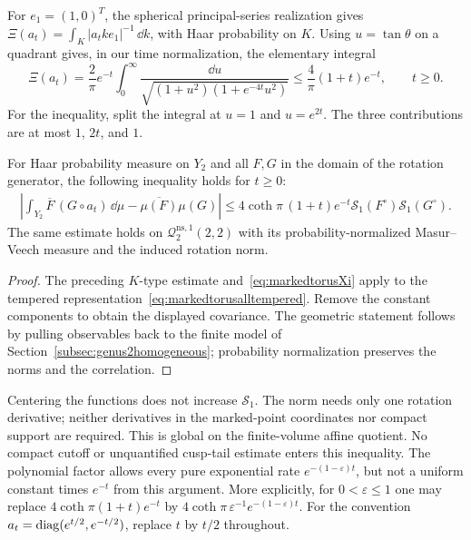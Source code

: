 For $e_1=(1,0)^T$, the spherical principal-series realization gives
$\Xi(a_t)=\int_K|a_tke_1|^{-1}\,\dd k$, with Haar probability on $K$.
Using $u=\tan\theta$ on a quadrant gives, in our time normalization,
the elementary integral
\begin{equation}
 \Xi(a_t)=\frac2\pi e^{-t}
   \int_0^\infty
    \frac{\dd u}{\sqrt{(1+u^2)(1+e^{-4t}u^2)}}
 \leq\frac4\pi(1+t)e^{-t},\qquad t\geq0.
 \label{eq:markedtorusXi}
\end{equation}
For the inequality, split the integral at $u=1$ and $u=e^{2t}$.
The three contributions are at most $1$, $2t$, and $1$.
\begin{theorem}
\label{thm:markedtorusmixing}
For Haar probability measure on $Y_2$ and all $F,G$ in the domain
of the rotation generator, the following inequality holds for $t\geq0$:
\begin{equation}
 \begin{split}
 \left|\int_{Y_2}\overline F\,(G\circ a_t)\,\dd\mu
       -\overline{\mu(F)}\mu(G)\right|
 \leq4\coth\pi\,(1+t)e^{-t}
       \mathcal S_1(F^\circ)\mathcal S_1(G^\circ).
 \end{split}
 \label{eq:markedtorusexplicitmix}
\end{equation}
The same estimate holds on $\mathcal Q^{\mathrm{ns},1}_2(2,2)$
with its probability-normalized Masur--Veech measure and the induced
rotation norm.
\end{theorem}
\begin{proof}
The preceding $K$-type estimate and~\eqref{eq:markedtorusXi} apply
to the tempered representation~\eqref{eq:markedtorusalltempered}.
Remove the constant components to obtain the displayed covariance.
The geometric statement follows by pulling observables back to the
finite model of Section~\ref{subsec:genus2homogeneous}; probability
normalization preserves the norms and the correlation.
\end{proof}
Centering the functions does not increase $\mathcal S_1$.
The norm needs only one rotation derivative; neither derivatives in
the marked-point coordinates nor compact support are required.
This is global on the finite-volume affine quotient. No compact
cutoff or unquantified cusp-tail estimate enters this inequality.
The polynomial factor allows every pure exponential rate
$e^{-(1-\varepsilon)t}$, but not a uniform constant times $e^{-t}$
from this argument. More explicitly, for $0<\varepsilon\leq1$ one
may replace $4\coth\pi(1+t)e^{-t}$ by
$4\coth\pi\,\varepsilon^{-1}e^{-(1-\varepsilon)t}$.
For the convention $a_t=\operatorname{diag}(e^{t/2},e^{-t/2})$, replace $t$
by $t/2$ throughout.

